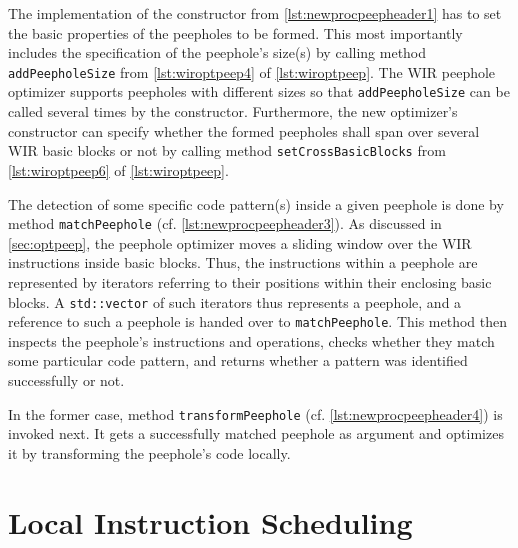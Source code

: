 The implementation of the constructor from \cref{lst:newprocpeepheader1} has to set the basic properties of the peepholes to be formed.
This most importantly includes the specification of the peephole's size(s) by calling method \texttt{addPeepholeSize} from \cref{lst:wiroptpeep4} of \cref{lst:wiroptpeep}.
The \gls{WIR} peephole optimizer supports peepholes with different sizes so that \texttt{addPeepholeSize} can be called several times by the constructor.
Furthermore, the new optimizer's constructor can specify whether the formed peepholes shall span over several \gls{WIR} basic blocks or not by calling method \texttt{setCrossBasicBlocks} from \cref{lst:wiroptpeep6} of \cref{lst:wiroptpeep}.

The detection of some specific code pattern(s) inside a given peephole is done by method \texttt{matchPeephole} (cf. \cref{lst:newprocpeepheader3}).
As discussed in \cref{sec:optpeep}, the peephole optimizer moves a sliding window over the \gls{WIR} instructions inside basic blocks.
Thus, the instructions within a peephole are represented by iterators referring to their positions within their enclosing basic blocks.
A \texttt{std::vector} of such iterators thus represents a peephole, and a reference to such a peephole is handed over to \texttt{matchPeephole}.
This method then inspects the peephole's instructions and operations, checks whether they match some particular code pattern, and returns whether a pattern was identified successfully or not.

In the former case, method \texttt{transformPeephole} (cf. \cref{lst:newprocpeepheader4}) is invoked next.
It gets a successfully matched peephole as argument and optimizes it by transforming the peephole's code locally.


\section{Local Instruction Scheduling}
\label{sec:optschedretarget}

